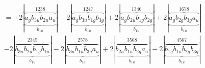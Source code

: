\documentclass{article}
\begin{document}
\begin{multline*}
=+2\left|\underbrace{\overbrace{a_{g} b_{3u} b_{2u} a_{u}}^{1 2 3 8}}_{b_{1u}}\right|-2\left|\underbrace{\overbrace{a_{g} b_{3u} b_{1g} b_{3g}}^{1 2 4 7}}_{b_{1u}}\right|+2\left|\underbrace{\overbrace{a_{g} b_{2u} b_{1g} b_{2g}}^{1 3 4 6}}_{b_{1u}}\right|+2\left|\underbrace{\overbrace{a_{g} b_{2g} b_{3g} a_{u}}^{1 6 7 8}}_{b_{1u}}\right|\\
-2\left|\underbrace{\overbrace{b_{3u} b_{2u} b_{1g} b_{1u}}^{2 3 4 5}}_{b_{1u}}\right|-2\left|\underbrace{\overbrace{b_{3u} b_{1u} b_{3g} a_{u}}^{2 5 7 8}}_{b_{1u}}\right|+2\left|\underbrace{\overbrace{b_{2u} b_{1u} b_{2g} a_{u}}^{3 5 6 8}}_{b_{1u}}\right|-2\left|\underbrace{\overbrace{b_{1g} b_{1u} b_{2g} b_{3g}}^{4 5 6 7}}_{b_{1u}}\right|
\end{multline*}
\\\\
\end{document}
